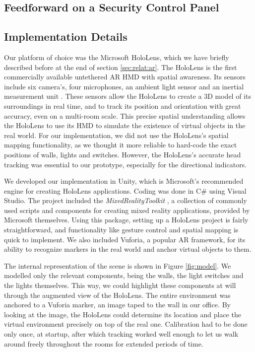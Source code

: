 \subsection{Feedforward on a Security Control Panel}


\subsection{Implementation Details}
Our platform of choice was the Microsoft HoloLens, which we have briefly described before at the end of section \ref{sec:relat:ar}. The HoloLens is the first commercially available untethered AR HMD with spatial awareness. Its sensors include six camera's, four microphones, an ambient light sensor and an inertial measurement unit \cite{HoloLens84:online}. These sensors allow the HoloLens to create a 3D model of its surroundings in real time, and to track its position and orientation with great accuracy, even on a multi-room scale. This precise spatial understanding allows the HoloLens to use its HMD to simulate the existence of virtual objects in the real world. For our implementation, we did not use the HoloLens's spatial mapping functionality, as we thought it more reliable to hard-code the exact positions of walls, lights and switches. However, the HoloLens's accurate head tracking was essential to our prototype, especially for the directional indicators.

We developed our implementation in Unity, which is Microsoft's recommended engine for creating HoloLens applications. Coding was done in C\# using Visual Studio. The project included the \textit{MixedRealityToolkit} \cite{Microsof99:online}, a collection of commonly used scripts and components for creating mixed reality applications, provided by Microsoft themselves. Using this package, setting up a HoloLens project is fairly straightforward, and functionality like gesture control and spatial mapping is quick to implement. We also included Vuforia, a popular AR framework, for its ability to recognize markers in the real world and anchor virtual objects to them.

The internal representation of the scene is shown in Figure \ref{fig:model}. We modelled only the relevant components, being the walls, the light switches and the lights themselves. This way, we could highlight these components at will through the augmented view of the HoloLens. The entire environment was anchored to a Vuforia marker, an image taped to the wall in our office. By looking at the image, the HoloLens could determine its location and place the virtual environment precisely on top of the real one. Calibration had to be done only once, at startup, after which tracking worked well enough to let us walk around freely throughout the rooms for extended periods of time.

